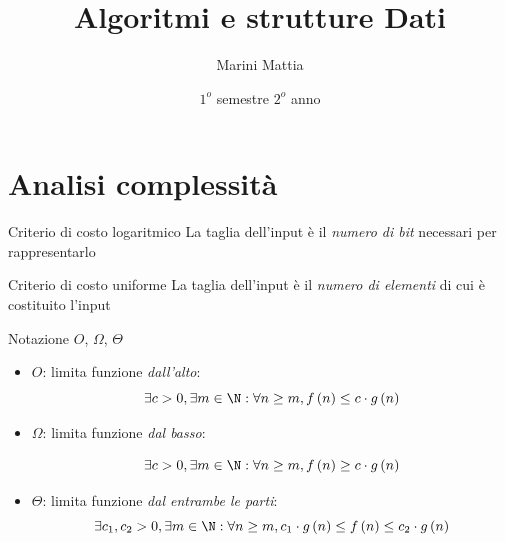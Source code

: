 
\endofdump

\usepackage{array}
\usepackage{makecell}

\usetikzlibrary{external}
\tikzexternalize[prefix=tikz/]


\title{Algoritmi e strutture Dati}
\author{Marini Mattia}
\date{$ 1^o $ semestre $ 2^o $ anno}


\maketitle
\tableofcontents
\newpage


\section{Analisi complessità}
\begin{definizione}{Criterio di costo logaritmico}
	La taglia dell’input è il \textit{numero di bit} necessari per rappresentarlo
\end{definizione}

\begin{definizione}{Criterio di costo uniforme}
	La taglia dell’input è il \textit{numero di elementi} di cui è costituito l'input
\end{definizione}

\begin{definizione}{Notazione $ O $, $ \Omega $, $ \Theta $ }
	\begin{itemize}
		\item $ O $: limita funzione \textit{dall'alto}:
		      \[
			      \exists c > 0, \exists m \in \N : \forall n \ge m,  f\left(n\right) \le c \cdot g\left(n\right)
		      \]
		\item $ \Omega $: limita funzione \textit{dal basso}:



		      \[
			      \exists c > 0, \exists m \in \N : \forall n \ge m,  f\left(n\right) \ge c \cdot g\left(n\right)
		      \]

		\item $ \Theta  $: limita funzione \textit{dal entrambe le parti}:
		      \[
			      \exists c_1, c_2 > 0, \exists m \in \N : \forall n \ge m,  c_1 \cdot g\left(n\right) \le f\left(n\right) \le c_2 \cdot g\left(n\right)
		      \]
	\end{itemize}
\end{definizione}\label{notazione ogrande}

